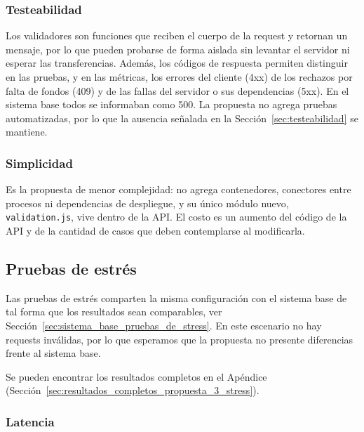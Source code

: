         \subsubsection{Testeabilidad}
        \label{sec:propuesta_3_testeabilidad}

        Los validadores son funciones que reciben el cuerpo de la request y retornan un mensaje, por lo que pueden probarse
        de forma aislada sin levantar el servidor ni esperar las transferencias. Además, los códigos de respuesta permiten
        distinguir en las pruebas, y en las métricas, los errores del cliente (4xx) de los rechazos por falta de fondos (409)
        y de las fallas del servidor o sus dependencias (5xx). En el sistema base todos se informaban como 500.
        La propuesta no agrega pruebas automatizadas, por lo que la ausencia señalada en la
        Sección~\ref{sec:testeabilidad} se mantiene.

        \subsubsection{Simplicidad}
        \label{sec:propuesta_3_simplicidad}

        Es la propuesta de menor complejidad: no agrega contenedores, conectores entre procesos ni dependencias de despliegue, y su único módulo nuevo, \texttt{validation.js}, vive dentro de la API.
        El costo es un aumento del código de la API y de la cantidad de casos que deben contemplarse al modificarla.

    \subsection{Pruebas de estrés}
    \label{sec:propuesta_3_pruebas_de_stress}

    Las pruebas de estrés comparten la misma configuración con el sistema base de tal forma que los resultados sean comparables, ver Sección~\ref{sec:sistema_base_pruebas_de_stress}.
    En este escenario no hay requests inválidas, por lo que esperamos que la propuesta no presente diferencias frente al sistema base.

    Se pueden encontrar los resultados completos en el Apéndice (Sección~\ref{sec:resultados_completos_propuesta_3_stress}).

        \subsubsection{Latencia}
        \label{sec:propuesta_3_pruebas_de_stress_metricas_latencia}

